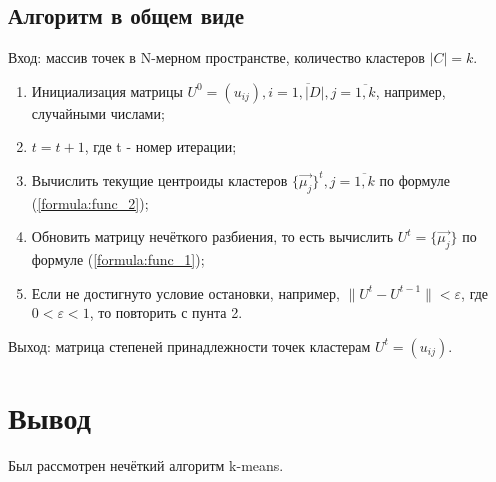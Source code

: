 	\subsection{Алгоритм в общем виде}
	\par Вход: массив точек в N-мерном пространстве, количество кластеров \begin{math}|C| = k\end{math}.
	\begin{enumerate}
		\item Инициализация матрицы \begin{math}U^0 = (u_{ij}), i = \overline{1, |D|}, j = \overline{1,k}\end{math}, например, случайными числами;
		\item \begin{math}t = t + 1\end{math}, где t - номер итерации;
		\item Вычислить текущие центроиды кластеров \begin{math} \{ \vec{\mu_j} \}^t, j = \overline{1, k} \end{math} по формуле (\ref{formula:func_2});
		\item Обновить матрицу нечёткого разбиения, то есть вычислить \begin{math} U^t = \{ \vec{\mu_j} \} \end{math} по формуле (\ref{formula:func_1});
		\item Если не достигнуто условие остановки, например, \begin{math} \|U^t - U^{t-1}\| < \varepsilon \end{math}, где \begin{math} 0 < \varepsilon < 1\end{math}, то повторить с пунта 2.
	\end{enumerate}
	\par Выход: матрица степеней принадлежности точек кластерам \begin{math} U^t = (u_{ij}) \end{math}.
	\section*{Вывод}
\par Был рассмотрен нечёткий алгоритм k-means.
\newpage
